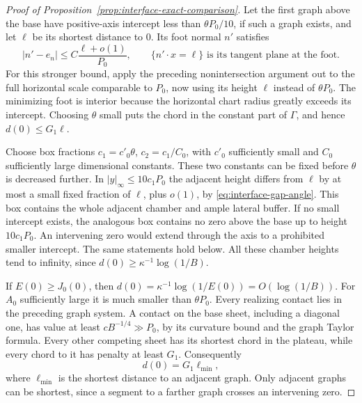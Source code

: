 \begin{proof}[Proof of Proposition~\ref{prop:interface-exact-comparison}]
Let the first graph above the base have positive-axis intercept
less than $\theta P_0/10$, if such a graph exists, and let $\ell$
be its shortest distance to $0$.  Its foot normal $n'$ satisfies
\begin{equation}\label{eq:interface-gap-angle}
 |n'-e_n|\le C\frac{\ell+o(1)}{P_0},\qquad
 \{n'\cdot x=\ell\}\text{ is its tangent plane at the foot}.
\end{equation}
For this stronger bound, apply the preceding nonintersection argument
out to the full horizontal scale comparable to $P_0$, now using
its height $\ell$ instead of $\theta P_0$.  The minimizing foot
is interior because the horizontal chart radius greatly exceeds
its intercept.  Choosing $\theta$ small puts the chord in the
constant part of $\Gamma$, and hence $d(0)\le G_1\ell$.

Choose box fractions $c_1=c'_0\theta$, $c_2=c_1/C_0$, with $c'_0$
sufficiently small and $C_0$ sufficiently large dimensional constants.
These two constants can be fixed before $\theta$ is decreased further.
In $|y|_\infty\le10c_1P_0$ the adjacent height differs from $\ell$
by at most a small fixed fraction of $\ell$, plus $o(1)$, by
\eqref{eq:interface-gap-angle}.  This box contains the whole adjacent
chamber and ample lateral buffer.  If no small intercept exists,
the analogous box contains no zero above the base up to height
$10c_1P_0$.  An intervening zero would extend through the axis to
a prohibited smaller intercept.  The same statements hold below.
All these chamber heights tend to infinity, since
$d(0)\ge\kappa^{-1}\log(1/B)$.

If $E(0)\ge J_0(0)$, then
$d(0)=\kappa^{-1}\log(1/E(0))=O(\log(1/B))$.
For $A_0$ sufficiently large it is much smaller than $\theta P_0$.
Every realizing contact lies in the preceding graph system.  A contact
on the base sheet, including a diagonal one, has value at least
$cB^{-1/4}\gg P_0$, by its curvature bound and the graph Taylor
formula.  Every other competing sheet has its shortest chord in the
plateau, while every chord to it has penalty at least $G_1$.
Consequently
\begin{equation}\label{eq:interface-real-gap}
 d(0)=G_1\ell_{\min},
\end{equation}
where $\ell_{\min}$ is the shortest distance to an adjacent graph.
Only adjacent graphs can be shortest, since a segment to a farther
graph crosses an intervening zero.


\end{proof}
